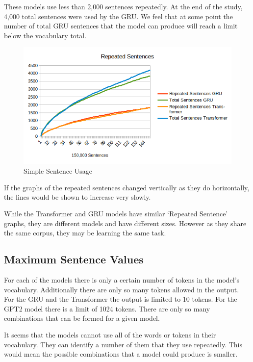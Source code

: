 These models use less than 2,000 sentences repeatedly. At the end of the study, 4,000 total sentences were used by the GRU. We feel that at some point the number of total GRU sentences that the model can produce will reach a limit below the vocabulary total.

\begin{figure}[H]
	\begin{center}
		\includegraphics[scale=0.75]{diagram-output-repeated-02}
		
		
	\end{center}
	\caption[Simple Sentence Usage]{Simple Sentence Usage}
	\label{diagram-words-limit-shown}
	
\end{figure}

If the graphs of the repeated sentences changed vertically as they do horizontally, the lines would be shown to increase very slowly.

While the Transformer and GRU models have similar `Repeated Sentence' graphs, they are different models and have different sizes. 
However as they share the same corpus, they may be learning the same task.

\subsection{Maximum Sentence Values}

For each of the models there is only a certain number of tokens in the model's vocabulary. Additionally there are only so many tokens allowed in the output. For the GRU and the Transformer the output is limited to 10 tokens. For the GPT2 model there is a limit of 1024 tokens. There are only so many combinations that can be formed for a given model.

It seems that the models cannot use all of the words or tokens in their vocabulary. They can identify a number of them that they use repeatedly. This would mean the possible combinations that a model could produce is smaller.

